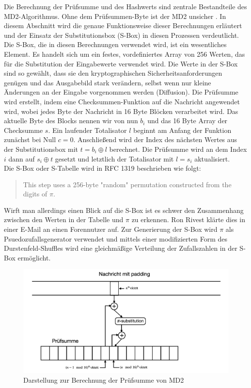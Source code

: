 Die Berechnung der Prüfsumme und des Hashwerts sind zentrale Bestandteile des
MD2-Algorithmus. Ohne dem Prüfsummen-Byte ist der MD2 unsicher \cite{rogier1997}.
In diesem Abschnitt wird die genaue Funktionsweise dieser
Berechnungen erläutert und der Einsatz der Substitutionsbox (S-Box) in diesen
Prozessen verdeutlicht.
Die S-Box, die in diesen Berechnungen verwendet wird, ist ein wesentliches
Element.
Es handelt sich um ein festes, vordefiniertes Array von 256 Werten,
das für die Substitution der Eingabewerte verwendet wird.
Die Werte in der S-Box
sind so gewählt, dass sie den kryptographischen Sicherheitsanforderungen genügen
und das Ausgabebild stark verändern, selbst wenn nur kleine Änderungen an der
Eingabe vorgenommen werden (Diffusion).
Die Prüfsumme wird erstellt, indem eine Checksummen-Funktion auf die Nachricht
angewendet wird, wobei jedes Byte der Nachricht in 16 Byte Blöcken verarbeitet wird.
Das aktuelle Byte des Blocks nennen wir von nun $b_i$ und das 16 Byte Array der
Checksumme $s$.
Ein laufender Totalisator $l$ beginnt am Anfang der Funktion zunächst bei Null $c = 0$.
Anschließend wird der  Index des nächsten Wertes aus der Substitutionsbox mit
$t = b_i \oplus l$ berechnet.
Die Prüfsumme wird an dem Index $i$ dann auf $s_i \oplus t$ gesetzt und letztlich
der Totalisator mit $l = s_i$ aktualisiert.
\\
Die S-Box oder S-Tabelle wird in RFC 1319 \cite{rfc1319} beschrieben wie folgt:
\begin{quote}
    This step uses a 256-byte "random" permutation constructed from the digits of $\pi$.      
\end{quote}
Wirft man allerdings einen Blick auf die S-Box ist es schwer den Zusammenhang 
zwischen den Werten in der Tabelle und $\pi$ zu erkennen. 
Ron Rivest klärte dies in einer E-Mail an einen Forennutzer auf. Zur 
Generierung der S-Box wird $\pi$ als Psuedozufallsgenerator verwendet und mittels 
einer modifizierten Form des Durstenfeld-Shuffles wird eine gleichmäßige Verteilung der
Zufallszahlen in der S-Box ermöglicht.\cite{crypto_stackexchange_18444}

\begin{figure}[h]
      \centering
      \includegraphics[scale=0.6]{pics/md2diagramchecksum.jpg}
      \caption{Darstellung zur Berechnung der Prüfsumme von MD2\cite{jain2009}}
\end{figure}

